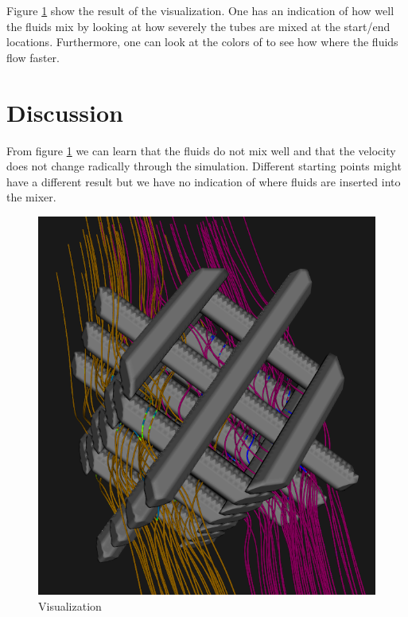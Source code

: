 \documentclass{article}[10pt]
\begin{document}

Figure \ref{fig:1} show the result of the visualization. One has an indication
of how well the fluids mix by looking at how severely the tubes are mixed at the
start/end locations. Furthermore, one can look at the colors of to see how where
the fluids flow faster.

\section{Discussion}
From figure \ref{fig:1} we can learn that the fluids do not mix well and that
the velocity does not change radically through the simulation. Different
starting points might have a different result but we have no indication of where
fluids are inserted into the mixer.

\begin{figure}[h]
    \includegraphics[width=\textwidth]{purple_yellow}
    \caption{Visualization}
    \label{fig:1}
\end{figure}

\end{document}
